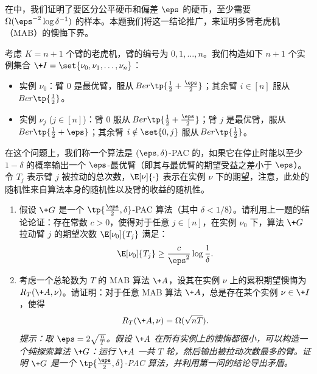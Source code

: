 \begin{problem}
    在中，我们证明了要区分公平硬币和偏差 $\eps$ 的硬币，至少需要 $\Omega(\eps^{-2}\log \delta^{-1})$ 的样本。本题我们将这一结论推广，来证明多臂老虎机（MAB）的懊悔下界。
    
    考虑 $K = n+1$ 个臂的老虎机，臂的编号为 $0, 1, \dots, n$。我们构造如下 $n+1$ 个实例集合 $\+I = \set{\nu_0, \nu_1, \dots, \nu_n}$：
    \begin{itemize}
        \item 实例 $\nu_0$：臂 $0$ 是最优臂，服从 $\!{Ber}\tp{\frac{1}{2} + \frac{\eps}{2}}$；其余臂 $i \in [n]$ 服从 $\!{Ber}\tp{\frac{1}{2}}$。
        \item 实例 $\nu_j$ ($j \in [n]$)：臂 $0$ 服从 $\!{Ber}\tp{\frac{1}{2} + \frac{\eps}{2}}$；臂 $j$ 是最优臂，服从 $\!{Ber}\tp{\frac{1}{2} + \eps}$；其余臂 $i \notin \set{0, j}$ 服从 $\!{Ber}\tp{\frac{1}{2}}$。
    \end{itemize}
    在这个问题上，我们称一个算法是 $(\eps, \delta)$-PAC 的，如果它在停止时能以至少 $1-\delta$ 的概率输出一个 $\eps$-最优臂（即其与最优臂的期望受益之差小于 $\eps$）。令 $T_j$ 表示臂 $j$ 被拉动的总次数，$\E[\nu]{\cdot}$ 表示在实例 $\nu$ 下的期望，注意，此处的随机性来自算法本身的随机性以及臂的收益的随机性。
    
    \begin{enumerate}
        \item 假设 $\+G$ 是一个 $\tp{\frac{\eps}{2}, \delta}$-PAC 算法（其中 $\delta < 1/8$）。请利用上一题的结论论证：存在常数 $c>0$，使得对于任意 $j \in [n]$，在实例 $\nu_0$ 下，算法 $\+G$ 拉动臂 $j$ 的期望次数 $\E[\nu_0]{T_j}$ 满足：
        \[
             \E[\nu_0]{T_j} \ge \frac{c}{\eps^2} \log \frac{1}{\delta} .
        \]
        \item 考虑一个总轮数为 $T$ 的 MAB 算法 $\+A$，设其在实例 $\nu$ 上的累积期望懊悔为 $R_T(\+A, \nu)$。请证明：对于任意 MAB 算法 $\+A$，总是存在某个实例 $\nu \in \+I$，使得
        \[
            R_T(\+A, \nu) = \Omega(\sqrt{nT}).
        \]
        \textit{提示：取 $\eps = 2\sqrt{\frac{n}{T}}$。假设 $\+A$ 在所有实例上的懊悔都很小，可以构造一个纯探索算法 $\+G$：运行 $\+A$ 一共 $T$ 轮，然后输出被拉动次数最多的臂。证明 $\+G$ 是一个 $\tp{\frac{\eps}{2}, \delta}$-PAC 算法，并利用第一问的结论导出矛盾。}
    \end{enumerate}
\end{problem}

